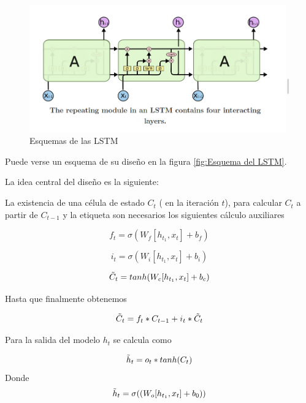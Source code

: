 \documentclass[11pt,twoside,titlepage,a4paper]{article}
\numberwithin{equation}{section} %
\theoremstyle{usual}
\begin{document}
    \begin{figure}[!h]
        \centering
        \includegraphics[width=\textwidth]{Source/images/LSTM.png}
        \caption{Esquemas de las LSTM}
        \label{fig:diagrama}
    \end{figure}

Puede verse un esquema de su diseño en la figura \ref{fig:Esquema del LSTM}. 

La idea central del diseño es la siguiente: 

La existencia de una célula de estado $C_t$ ( en la iteración $t$), para calcular $C_t$ a partir de $C_{t-1}$ y la etiqueta son necesarios los siguientes cálculo auxiliares 

\begin{equation}
    f_t = \sigma (W_f [h_{t_1}, x_t] + b_f)
\end{equation}

\begin{equation}
i_ t = \sigma (W_i [h_{t_1}, x_t] + b_i)
\end{equation}

\begin{equation}
 \Tilde{C}_t = tanh(W_c [h_{t_1}, x_t] + b_c)
\end{equation}

Hasta que finalmente obtenemos

\begin{equation}
 \Tilde{C}_t = f_t * C_{t-1} + i_t * \Tilde{C}_t
\end{equation}

Para la salida del modelo $h_t$ se calcula como   

\begin{equation}
 \Tilde{h}_t = o_t * tanh(C_t)
\end{equation}
Donde 
\begin{equation}
 \Tilde{h}_t = \sigma ((W_o[h_{t_1}, x_t] + b_0)) 
\end{equation}   
\end{document}
